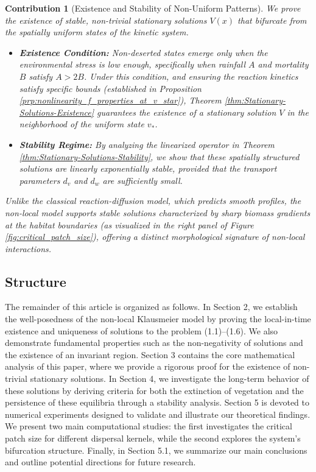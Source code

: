 \documentclass[11pt, a4paper]{article}
\theoremstyle{break}
\theoremstyle{break}
\theoremstyle{break}
\theoremstyle{break}
\theoremstyle{break}
\theoremstyle{break}
\theoremstyle{break}
\theoremstyle{break}
\theoremstyle{break}
\theoremstyle{break}
\newtheorem{main_contrib}{Contribution}
\begin{document}
\begin{main_contrib}[Existence and Stability of Non-Uniform Patterns]
We prove the existence of stable, non-trivial stationary solutions $V(x)$ that bifurcate from the spatially uniform states of the kinetic system.
\begin{itemize}
    \item \textbf{Existence Condition:} Non-deserted states emerge only when the environmental stress is low enough, specifically when rainfall $A$ and mortality $B$ satisfy $A > 2B$. Under this condition, and ensuring the reaction kinetics satisfy specific bounds (established in Proposition \ref{prp:nonlinearity_f_properties_at_v_star}), Theorem \ref{thm:Stationary-Solutions-Existence} guarantees the existence of a stationary solution $V$ in the neighborhood of the uniform state $v_*$.
    \item \textbf{Stability Regime:} By analyzing the linearized operator in Theorem \ref{thm:Stationary-Solutions-Stability}, we show that these spatially structured solutions are linearly exponentially stable, provided that the transport parameters $d_v$ and $d_w$ are sufficiently small.
\end{itemize}
Unlike the classical reaction-diffusion model, which predicts smooth profiles, the non-local model supports stable solutions characterized by sharp biomass gradients at the habitat boundaries (as visualized in the right panel of Figure \ref{fig:critical_patch_size}), offering a distinct morphological signature of non-local interactions.
\end{main_contrib}


\subsection{Structure}
The remainder of this article is organized as follows. 
In Section 2, we establish the well-posedness of the non-local Klausmeier model by proving the local-in-time existence and uniqueness of solutions to the problem (1.1)--(1.6). We also demonstrate fundamental properties such as the non-negativity of solutions and the existence of an invariant region. 
Section 3 contains the core mathematical analysis of this paper, where we provide a rigorous proof for the existence of non-trivial stationary solutions. 
In Section 4, we investigate the long-term behavior of these solutions by deriving criteria for both the extinction of vegetation and the persistence of these equilibria through a stability analysis. 
Section 5 is devoted to numerical experiments designed to validate and illustrate our theoretical findings. We present two main computational studies: the first investigates the critical patch size for different dispersal kernels, while the second explores the system's bifurcation structure. 
Finally, in Section 5.1, we summarize our main conclusions and outline potential directions for future research.
\end{document}
